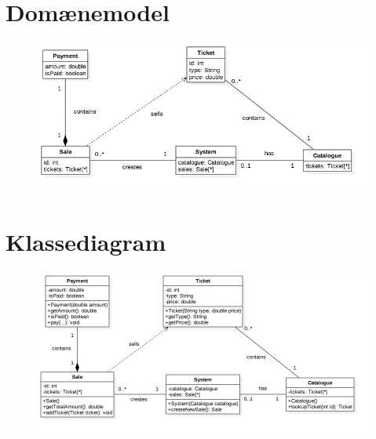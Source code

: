 \section{Domænemodel}
\begin{figure}[H]
    \begin{center}
        \includegraphics[width=1\textwidth]{Domainmodel.png}
    \end{center}
\end{figure}

\section{Klassediagram}
\begin{figure}[H]
    \begin{center}
        \includegraphics[width=1\textwidth]{Klassediagram.png}
    \end{center}
\end{figure}


